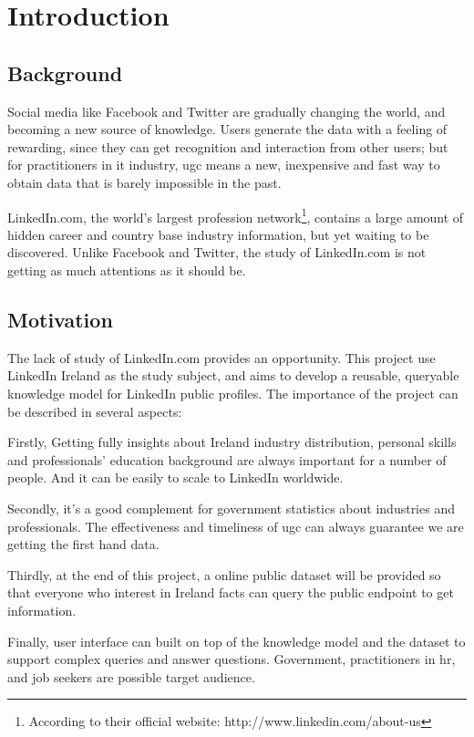 \chapter{Introduction}

\section{Background}
Social media like Facebook and Twitter are gradually changing the world, and becoming a new source of knowledge. Users generate the data with a feeling of rewarding, since they can get recognition and interaction from other users\cite{krumm2008user}; but for practitioners in \gls{it} industry, \gls{ugc} means a new, inexpensive and fast way to obtain data that is barely impossible in the past.

LinkedIn.com, the world's largest profession network\footnote{According to their official website: http://www.linkedin.com/about-us}, contains a large amount of hidden career and country base industry information, but yet waiting to be discovered. Unlike Facebook and Twitter, the study of LinkedIn.com is not getting as much attentions as it should be. 

\section{Motivation}
The lack of study of LinkedIn.com provides an opportunity. This project use LinkedIn Ireland as the study subject, and aims to develop a reusable, queryable knowledge model for LinkedIn public profiles. The importance of the project can be described in several aspects:

Firstly, Getting fully insights about Ireland industry distribution, personal skills and professionals' education background are always important for a number of people. And it can be easily to scale to LinkedIn worldwide.

Secondly, it's a good complement for government statistics about industries and professionals. The effectiveness and timeliness of \acrshort{ugc} can always guarantee we are getting the first hand data.

Thirdly, at the end of this project, a online public dataset will be provided so that everyone who interest in Ireland facts can query the public endpoint to get information.

Finally, user interface can built on top of the knowledge model and the dataset to support complex queries and answer questions. Government, practitioners in \gls{hr}, and job seekers are possible target audience.

